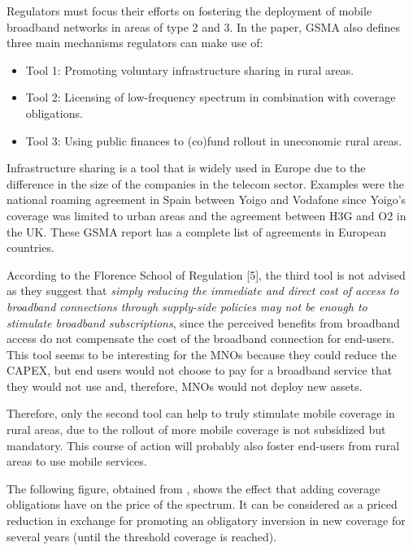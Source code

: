 Regulators must focus their efforts on fostering the deployment of mobile broadband networks in areas of type 2 and 3. In the paper, GSMA also defines three main mechanisms regulators can make use of:\par

\begin{itemize}
	\item Tool 1: Promoting voluntary infrastructure sharing in rural areas.\par

	\item Tool 2: Licensing of low-frequency spectrum in combination with coverage obligations.\par

	\item Tool 3: Using public finances to (co)fund rollout in uneconomic rural areas.
\end{itemize}\par

Infrastructure sharing is a tool that is widely used in Europe due to the difference in the size of the companies in the telecom sector. Examples were the national roaming agreement in Spain between Yoigo and Vodafone since Yoigo’s coverage was limited to urban areas and the agreement between H3G and O2 in the UK. These GSMA report \cite{2-04} has a complete list of agreements in European countries.\par

According to the Florence School of Regulation [5], the third tool is not advised as they suggest that \textit{\guillemotleft simply reducing the immediate and direct cost of access to broadband connections through supply-side policies may not be enough to stimulate broadband subscriptions\guillemotright }, since the perceived benefits from broadband access do not compensate the cost of the broadband connection for end-users. This tool seems to be interesting for the MNOs because they could reduce the CAPEX, but end users would not choose to pay for a broadband service that they would not use and, therefore, MNOs would not deploy new assets. \par

Therefore, only the second tool can help to truly stimulate mobile coverage in rural areas, due to the rollout of more mobile coverage is not subsidized but mandatory. This course of action will probably also foster end-users from rural areas to use mobile services.\par

The following figure, obtained from \cite{2-03}, shows the effect that adding coverage obligations have on the price of the spectrum. It can be considered as a priced reduction in exchange for promoting an obligatory inversion in new coverage for several years (until the threshold coverage is reached).

